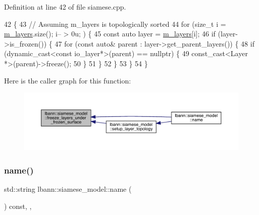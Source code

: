 Definition at line 42 of file siamese.\+cpp.


\begin{DoxyCode}
42                                                        \{
43   \textcolor{comment}{// Assuming m\_layers is topologically sorted}
44   \textcolor{keywordflow}{for} (\textcolor{keywordtype}{size\_t} i = \hyperlink{classlbann_1_1model_a0229fc226ec163d1411548446104569d}{m\_layers}.size(); i-- > 0u; ) \{
45     \textcolor{keyword}{const} \textcolor{keyword}{auto} layer = \hyperlink{classlbann_1_1model_a0229fc226ec163d1411548446104569d}{m\_layers}[i];
46     \textcolor{keywordflow}{if} (layer->is\_frozen()) \{
47       \textcolor{keywordflow}{for} (\textcolor{keyword}{const} \textcolor{keyword}{auto}& parent : layer->get\_parent\_layers()) \{
48         \textcolor{keywordflow}{if} (dynamic\_cast<const io\_layer*>(parent) == \textcolor{keyword}{nullptr}) \{
49           \textcolor{keyword}{const\_cast<}Layer *\textcolor{keyword}{>}(parent)->freeze();
50         \}
51       \}
52     \}
53   \}
54 \}
\end{DoxyCode}
Here is the caller graph for this function\+:\nopagebreak
\begin{figure}[H]
\begin{center}
\leavevmode
\includegraphics[width=350pt]{classlbann_1_1siamese__model_a3960a32fd45059516f3acb41549e1e92_icgraph}
\end{center}
\end{figure}
\mbox{\label{classlbann_1_1siamese__model_ad745961977aa395e11543d263103126e}} 
\subsubsection{\texorpdfstring{name()}{name()}}
{\footnotesize\ttfamily std\+::string lbann\+::siamese\+\_\+model\+::name (\begin{DoxyParamCaption}{ }\end{DoxyParamCaption}) const\hspace{0.3cm}{\ttfamily [inline]}, {\ttfamily [override]}, {\ttfamily [virtual]}}

